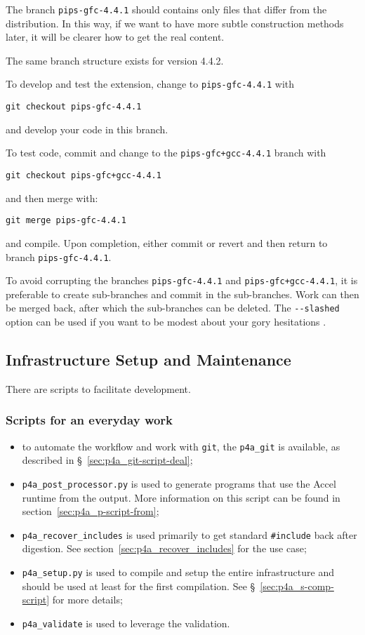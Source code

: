 \documentclass[a4paper]{article}
\begin{document}
The branch \texttt{pips-gfc-4.4.1} should contains only files that differ from
the \Agcc distribution. In this way, if we want to have more subtle
construction methods later, it will be clearer how to get the real
content.

The same branch structure exists for version 4.4.2.

To develop and test the \Apipsgfc extension, change to
\texttt{pips-gfc-4.4.1} with
\begin{verbatim}
git checkout pips-gfc-4.4.1
\end{verbatim}
and develop your code in this branch.

To test code, commit and change to the \texttt{pips-gfc+gcc-4.4.1} branch with
\begin{verbatim}
git checkout pips-gfc+gcc-4.4.1
\end{verbatim}
and then merge with:
\begin{verbatim}
git merge pips-gfc-4.4.1
\end{verbatim}
and compile. Upon completion, either commit or revert and then return
to branch \texttt{pips-gfc-4.4.1}.

To avoid corrupting the branches \texttt{pips-gfc-4.4.1} and
\texttt{pips-gfc+gcc-4.4.1}, it is preferable to create sub-branches
and commit in the sub-branches. Work can then be merged
back, after which the sub-branches can be deleted. The
\verb|--slashed| option can be used
if you want to be modest about your gory hesitations \smiley{}.


\subsection{Infrastructure Setup and Maintenance}
\label{sec:setup}

There are scripts to facilitate development.

\subsubsection{Scripts for an everyday work}
\label{sec:an-everyday-work}

\begin{itemize}
\item to automate the \Apfa workflow and work with \texttt{git}, the
  \verb|p4a_git| is available, as described in
  \S~\ref{sec:p4a_git-script-deal};
\item \verb|p4a_post_processor.py| is used to generate programs that use
  the \Apfa Accel runtime from the \Apips output. More information on
  this script can be found in section~\ref{sec:p4a_p-script-from};
\item \verb|p4a_recover_includes| is used primarily to get standard
  \verb|#include| back after \Apips digestion. See
  section~\ref{sec:p4a_recover_includes} for the use case;
\item \verb|p4a_setup.py| is used to compile and setup the entire \Apfa
  infrastructure and should be used at least for the first
  compilation. See \S~\ref{sec:p4a_s-comp-script} for more details;
\item \verb|p4a_validate| is used to leverage the \Apips validation.
\end{itemize}
\end{document}
